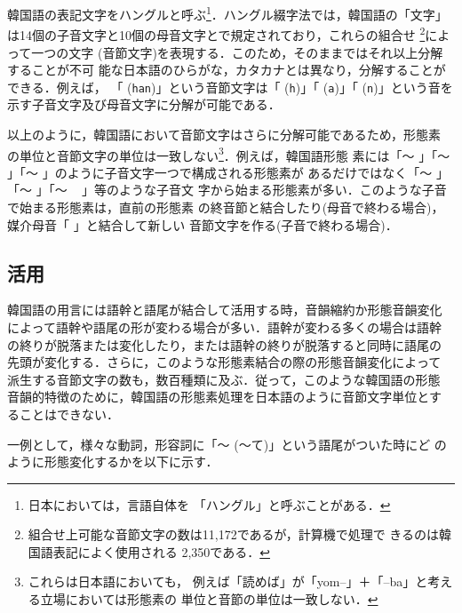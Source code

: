 韓国語の表記文字をハングルと呼ぶ\footnote{日本においては，言語自体を
  「ハングル」と呼ぶことがある．}．ハングル綴字法では，韓国語の「文字」
は14個の子音文字と10個の母音文字とで規定されており，これらの組合せ
{}\footnote{組合せ上可能な音節文字の数は11,172であるが，計算機で処理で
  きるのは韓国語表記によく使用される 2,350である．}によって一つの文字
(音節文字)を表現する．このため，そのままではそれ以上分解することが不可
能な日本語のひらがな，カタカナとは異なり，分解することができる．例えば，
「
({\tt han})」という音節文字は「
({\tt h})」「
({\tt a})」「
({\tt n})」という音を示す子音文字及び母音文字に分解が可能である．

以上のように，韓国語において音節文字はさらに分解可能であるため，形態素
の単位と音節文字の単位は一致しない\footnote{これらは日本語においても，
  例えば「読めば」が「yom--」＋「--ba」と考える立場においては形態素の
  単位と音節の単位は一致しない\cite{日本語百科}．}．例えば，韓国語形態
素には「〜
」「〜
」「〜
」のように子音文字一つで構成される形態素が
あるだけではなく「〜
」「〜
」「〜
\ 
」等のような子音文
字から始まる形態素が多い．このような子音で始まる形態素は，直前の形態素
の終音節と結合したり(母音で終わる場合)，媒介母音「
」と結合して新しい
音節文字を作る(子音で終わる場合)．



\subsection{活用}

韓国語の用言には語幹と語尾が結合して活用する時，音韻縮約か形態音韻変化
によって語幹や語尾の形が変わる場合が多い．語幹が変わる多くの場合は語幹
の終りが脱落または変化したり，または語幹の終りが脱落すると同時に語尾の
先頭が変化する．さらに，このような形態素結合の際の形態音韻変化によって
派生する音節文字の数も，数百種類に及ぶ．従って，このような韓国語の形態
音韻的特徴のために，韓国語の形態素処理を日本語のように音節文字単位とす
ることはできない．

一例として，様々な動詞，形容詞に「〜
(〜て)」という語尾がついた時にど
のように形態変化するかを以下に示す．
\vspace{\baselineskip}

